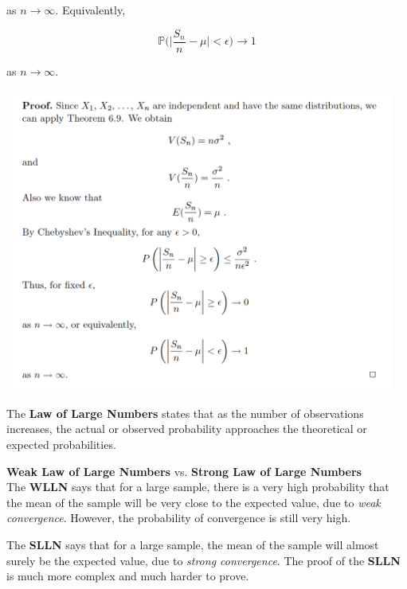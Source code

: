 \documentclass[12pt]{article}
\begin{document}
\noindent
as $n \rightarrow \infty$. Equivalently,

\begin{equation*}
\mathbb{P} \Bigg ( \Bigg \lvert \frac{S_n}{n} - \mu \Bigg \rvert < \epsilon \Bigg ) \rightarrow 1
\end{equation*}

\noindent
as $n \rightarrow \infty$. 

\begin{center}
\includegraphics[width=13cm, height=10cm]{LLN_proof_pic}
\end{center}

\noindent
The \textbf{Law of Large Numbers} states that as the number of observations increases, the actual or observed probability approaches the theoretical or expected probabilities. 

\vspace*{.3cm}
\noindent
\textbf{Weak Law of Large Numbers} vs. \textbf{Strong Law of Large Numbers} \\
\noindent
The \textbf{WLLN} says that for a large sample, there is a very high probability that the mean of the sample will be very close to the expected value, due to \textit{weak convergence}. However, the probability of convergence is still very high.

\vspace*{.3cm}
\noindent
The \textbf{SLLN} says that for a large sample, the mean of the sample will almost surely be the expected value, due to \textit{strong convergence}. The proof of the \textbf{SLLN} is much more complex and much harder to prove.
\end{document}
